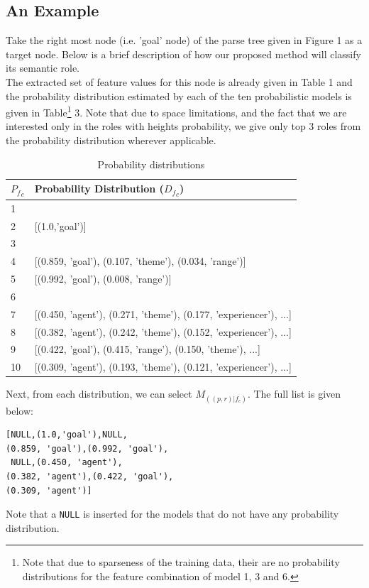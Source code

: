 \documentclass[11pt]{article}
\begin{document}
\subsection{An Example}
Take the right most node (i.e. 'goal' node) of the parse tree given in Figure 1 as a target node. Below is a brief description of how our proposed method will classify its semantic role.\\
The extracted set of feature values for this node is already given in Table 1 and the probability distribution estimated by each of the ten probabilistic models is given in Table\footnote{Note that due to sparseness of the training data, their are no probability distributions for the feature combination of model 1, 3 and 6.} 3. Note that due to space limitations, and the fact that we are interested only in the roles with heights probability, we give only top 3 roles from the probability distribution wherever applicable.
\begin{table}[!h]
\small
\begin{tabular}{|l|p{6.3cm}|}
\hline \bf ${P_f}_c$ & \bf  Probability Distribution (${D_f}_c$) \\ 
\hline 1 &  \\ 
\hline 2 & [(1.0,'goal')]\\ 
\hline 3 &  \\ 
\hline 4 & [(0.859, 'goal'), (0.107, 'theme'), (0.034, 'range')] \\ 
\hline 5 & [(0.992, 'goal'), (0.008, 'range')]\\ 
\hline 6 & \\ 
\hline 7 & [(0.450, 'agent'), (0.271, 'theme'), (0.177, 'experiencer'), ...] \\ 
\hline 8 & [(0.382, 'agent'), (0.242, 'theme'), (0.152, 'experiencer'), ...]\\ 
\hline 9 & [(0.422, 'goal'), (0.415, 'range'), (0.150, 'theme'), ...] \\ 
\hline 10 & [(0.309, 'agent'), (0.193, 'theme'), (0.121, 'experiencer'), ...] \\ 
\hline 
\end{tabular}  
\caption{Probability distributions}
\end{table}
\noindent Next, from each distribution, we can select $M_{((p,r)|f_c)}$. The full list is given below:
\begin{verbatim}
[NULL,(1.0,'goal'),NULL,
(0.859, 'goal'),(0.992, 'goal'),
 NULL,(0.450, 'agent'),
(0.382, 'agent'),(0.422, 'goal'),
(0.309, 'agent')]
\end{verbatim}
Note that a \verb+NULL+ is inserted for the models that do not have any probability distribution.\\
\end{document}
